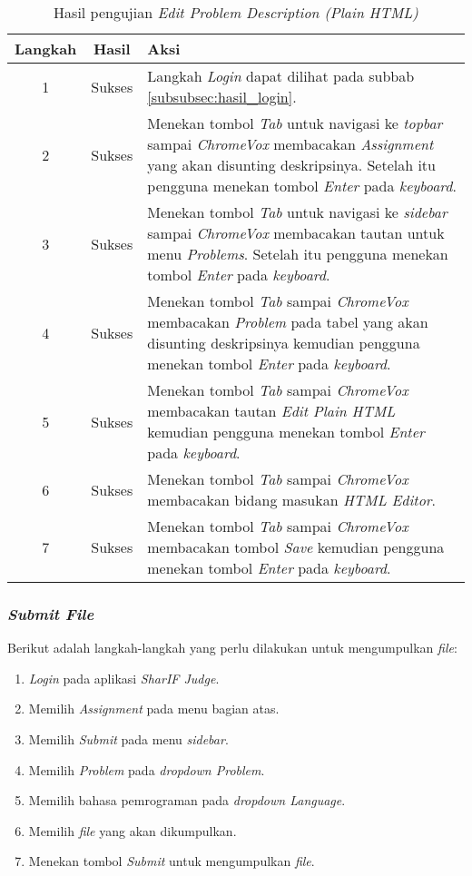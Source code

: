 \begin{table}[H]
	\centering
	\caption{Hasil pengujian \textit{Edit Problem Description (Plain HTML)}}
	\label{tab:hasil_edit_problem_description_plain_html}
	\begin{tabular}{|c|c|p{12cm}|}
		\toprule
		Langkah & Hasil & Aksi\\
		\midrule
		1 & Sukses & Langkah \textit{Login} dapat dilihat pada subbab \ref{subsubsec:hasil_login}.\\
		2 & Sukses & Menekan tombol \textit{Tab} untuk navigasi ke \textit{topbar} sampai \textit{ChromeVox} membacakan \textit{Assignment} yang akan disunting deskripsinya. Setelah itu pengguna menekan tombol \textit{Enter} pada \textit{keyboard}.\\
		3 & Sukses & Menekan tombol \textit{Tab} untuk navigasi ke \textit{sidebar} sampai \textit{ChromeVox} membacakan tautan untuk menu \textit{Problems}. Setelah itu pengguna menekan tombol \textit{Enter} pada \textit{keyboard}.\\
		4 & Sukses & Menekan tombol \textit{Tab} sampai \textit{ChromeVox} membacakan \textit{Problem} pada tabel yang akan disunting deskripsinya kemudian pengguna menekan tombol \textit{Enter} pada \textit{keyboard}.\\
		5 & Sukses & Menekan tombol \textit{Tab} sampai \textit{ChromeVox} membacakan tautan \textit{Edit Plain HTML} kemudian pengguna menekan tombol \textit{Enter} pada \textit{keyboard}.\\
		6 & Sukses & Menekan tombol \textit{Tab} sampai \textit{ChromeVox} membacakan bidang masukan \textit{HTML Editor}.\\
		7 & Sukses & Menekan tombol \textit{Tab} sampai \textit{ChromeVox} membacakan tombol \textit{Save} kemudian pengguna menekan tombol \textit{Enter} pada \textit{keyboard}.\\
		\bottomrule
	\end{tabular}
\end{table}

\subsubsection{\textit{Submit File}}
\label{subsubsec:skenario_submit}
Berikut adalah langkah-langkah yang perlu dilakukan untuk mengumpulkan \textit{file}:

\begin{enumerate}
	\item \textit{Login} pada aplikasi \textit{SharIF Judge}.
	\item Memilih \textit{Assignment} pada menu bagian atas.
	\item Memilih \textit{Submit} pada menu \textit{sidebar}.
	\item Memilih \textit{Problem} pada \textit{dropdown Problem}.
	\item Memilih bahasa pemrograman pada \textit{dropdown Language}.
	\item Memilih \textit{file} yang akan dikumpulkan.
	\item Menekan tombol \textit{Submit} untuk mengumpulkan \textit{file}.
\end{enumerate}

